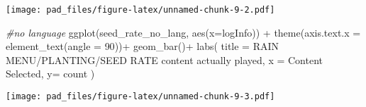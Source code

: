 \documentclass[
]{article}
\newenvironment{Shaded}{\begin{snugshade}}{\end{snugshade}}
\newcommand{\AttributeTok}[1]{\textcolor[rgb]{0.77,0.63,0.00}{#1}}
\newcommand{\CommentTok}[1]{\textcolor[rgb]{0.56,0.35,0.01}{\textit{#1}}}
\newcommand{\DecValTok}[1]{\textcolor[rgb]{0.00,0.00,0.81}{#1}}
\newcommand{\FunctionTok}[1]{\textcolor[rgb]{0.00,0.00,0.00}{#1}}
\newcommand{\NormalTok}[1]{#1}
\newcommand{\SpecialCharTok}[1]{\textcolor[rgb]{0.00,0.00,0.00}{#1}}
\newcommand{\StringTok}[1]{\textcolor[rgb]{0.31,0.60,0.02}{#1}}
\begin{document}
\texttt{[image: pad\_files/figure-latex/unnamed-chunk-9-2.pdf]}

\begin{Shaded}
\begin{Highlighting}[]
\CommentTok{\#no language}
\FunctionTok{ggplot}\NormalTok{(seed\_rate\_no\_lang, }\FunctionTok{aes}\NormalTok{(}\AttributeTok{x=}\NormalTok{logInfo)) }\SpecialCharTok{+}
  \FunctionTok{theme}\NormalTok{(}\AttributeTok{axis.text.x =} \FunctionTok{element\_text}\NormalTok{(}\AttributeTok{angle =} \DecValTok{90}\NormalTok{))}\SpecialCharTok{+}
  \FunctionTok{geom\_bar}\NormalTok{()}\SpecialCharTok{+}
  \FunctionTok{labs}\NormalTok{(}
    \AttributeTok{title =} \StringTok{\textquotesingle{}RAIN MENU/PLANTING/SEED RATE}
\StringTok{    content actually played\textquotesingle{}}\NormalTok{,}
    \AttributeTok{x =} \StringTok{\textquotesingle{}Content Selected\textquotesingle{}}\NormalTok{,}
    \AttributeTok{y=} \StringTok{\textquotesingle{}count\textquotesingle{}}
\NormalTok{  )}
\end{Highlighting}
\end{Shaded}

\texttt{[image: pad\_files/figure-latex/unnamed-chunk-9-3.pdf]}
\end{document}
